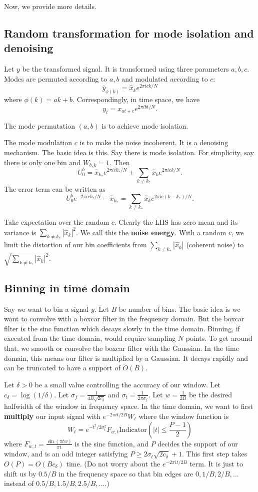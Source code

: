 \documentclass[10pt]{article}
\begin{document}
Now, we provide more details.

\subsection{Random transformation for mode isolation and denoising}
Let $y$ be the transformed signal. It is transformed using three parameters $a,b,c$. Modes are permuted according to $a, b$ and modulated according to $c$:
$$\hat{y}_{\phi(k)} = \hat{x}_k e^{2\pi i ck/N}$$
where $\phi(k) = ak+b$. Correspondingly, in time space, we have
$$y_t = x_{at+c} e^{2\pi i bt/N}.$$

The mode permutation $(a,b)$ is to achieve mode isolation.

The mode modulation $c$ is to make the noise incoherent. It is a denoising mechanism. The basic idea is this. Say there is mode isolation. For simplicity, say there is only one bin and $W_{b,k}=1$. Then
$$U^b_0 = \hat{x}_{k_*}e^{2\pi i c k_*/N} + \sum_{k\neq k_*} \hat{x}_k e^{2\pi i c k/N}.$$
The error term can be written as
$$U^b_0 e^{-2\pi i c k_*/N} -\hat{x}_{k_*} = \sum_{k\neq k_*} \hat{x}_k e^{2\pi i c(k-k_*)/N}.$$

Take expectation over the random $c$. Clearly the LHS has zero mean and its variance is $\sum_{k\neq k_*} |\hat{x}_k|^2$. We call this the \textbf{noise energy}. With a random $c$, we limit the distortion of our bin coefficients from $\sum_{k\neq k_*} |\hat{x}_k|$ (coherent noise) to $\sqrt{\sum_{k\neq k_*} |\hat{x}_k|^2}$.

\subsection{Binning in time domain}

Say we want to bin a signal $y$. Let $B$ be number of bins. The basic idea is we want to convolve with a boxcar filter in the frequency domain. But the boxcar filter is the sinc function which decays slowly in the time domain. Binning, if executed from the time domain, would require sampling $N$ points. To get around that, we smooth or convolve the boxcar filter with the Gaussian. In the time domain, this means our filter is multiplied by a Gaussian. It decays rapidly and can be truncated to have a support of $\tilde{O}(B)$.

Let $\delta>0$ be a small value controlling the accuracy of our window. Let $c_{\delta} = \log (1/\delta)$. Let $\sigma_f = \frac{1}{4B\sqrt{2c_{\delta}}}$ and $\sigma_t = \frac{1}{2\pi \sigma_f}$. Let $w=\frac{1}{2B}$ be the desired halfwidth of the window in frequency space. In the time domain, we want to first \textbf{multiply} our input signal with $e^{-2\pi i t/2B}W_t$ where the window function is 
$$W_t = e^{-t^2/2\sigma_t^2} F_{w,t} \text{Indicator}\left(|t|\leq \frac{P-1}{2}\right)$$
where $F_{w,t} = \frac{\sin(\pi t w)}{\pi t}$ is the sinc function, and $P$ decides the support of our window, and is an odd integer satisfying $P \geq 2\sigma_t \sqrt{2c_{\delta}} + 1$. This first step takes $O(P)=O(B c_{\delta})$ time. (Do not worry about the $e^{-2\pi i t/2B}$ term. It is just to shift us by $0.5/B$ in the frequency space so that bin edges are $0, 1/B, 2/B, \ldots$ instead of $0.5/B, 1.5/B, 2.5/B, \ldots$.)
\end{document}
